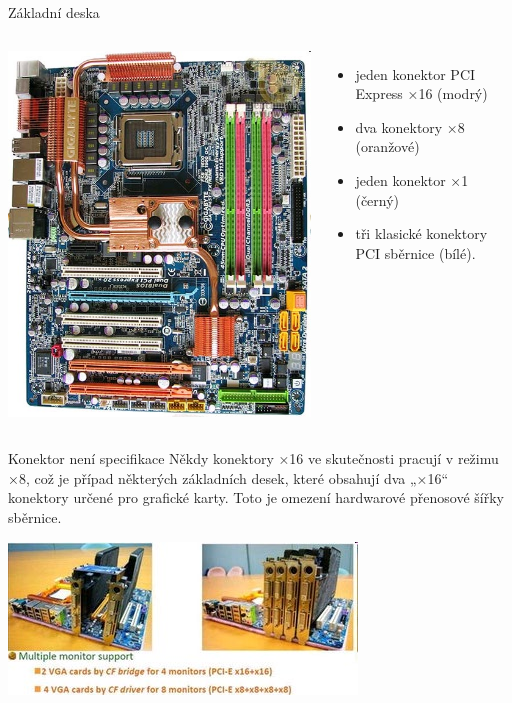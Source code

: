 \documentclass[aspectratio=43]{beamer}
\begin{document}
\begin{frame}{Základní deska}
	\begin{columns}
		\includegraphics[width=0.8\linewidth]{extrahovane_obrazky/img_2_page24_0.jpeg}
		\begin{itemize}
			\item jeden konektor PCI Express ×16 (modrý)
			\item dva konektory ×8 (oranžové)
			\item jeden konektor ×1 (černý)
			\item tři klasické konektory PCI sběrnice (bílé).
		\end{itemize}
	\end{columns}
	
\end{frame}


\begin{frame}{Konektor není specifikace}
	Někdy  konektory ×16 ve skutečnosti pracují v režimu ×8, což je případ některých základních desek, které obsahují dva „×16“ konektory určené
	pro grafické karty. Toto je omezení hardwarové přenosové šířky sběrnice.
	\begin{center}
		\includegraphics[width=0.8\linewidth]{extrahovane_obrazky/img_2_page25_0.jpeg}
	\end{center}
	
\end{frame}
\end{document}
